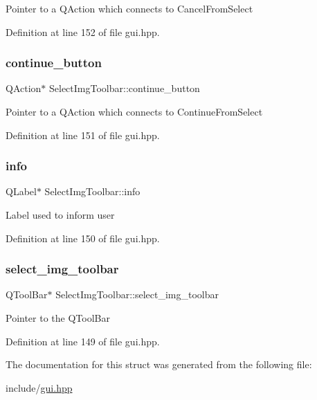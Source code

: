 Pointer to a Q\+Action which connects to Cancel\+From\+Select 

Definition at line 152 of file gui.\+hpp.

\mbox{\label{structSelectImgToolbar_a82569764f9d7e13b406a668e9e50290a}} 
\subsubsection{\texorpdfstring{continue\+\_\+button}{continue\_button}}
{\footnotesize\ttfamily Q\+Action$\ast$ Select\+Img\+Toolbar\+::continue\+\_\+button}

Pointer to a Q\+Action which connects to Continue\+From\+Select 

Definition at line 151 of file gui.\+hpp.

\mbox{\label{structSelectImgToolbar_a3cf6ac92fbe60877873c89939217e1de}} 
\subsubsection{\texorpdfstring{info}{info}}
{\footnotesize\ttfamily Q\+Label$\ast$ Select\+Img\+Toolbar\+::info}

Label used to inform user 

Definition at line 150 of file gui.\+hpp.

\mbox{\label{structSelectImgToolbar_a779bc326cf08c9fbcd1ffebb43a664eb}} 
\subsubsection{\texorpdfstring{select\+\_\+img\+\_\+toolbar}{select\_img\_toolbar}}
{\footnotesize\ttfamily Q\+Tool\+Bar$\ast$ Select\+Img\+Toolbar\+::select\+\_\+img\+\_\+toolbar}

Pointer to the Q\+Tool\+Bar 

Definition at line 149 of file gui.\+hpp.



The documentation for this struct was generated from the following file\+:\begin{DoxyCompactItemize}
\item 
include/\mbox{\hyperlink{gui_8hpp}{gui.\+hpp}}\end{DoxyCompactItemize}
